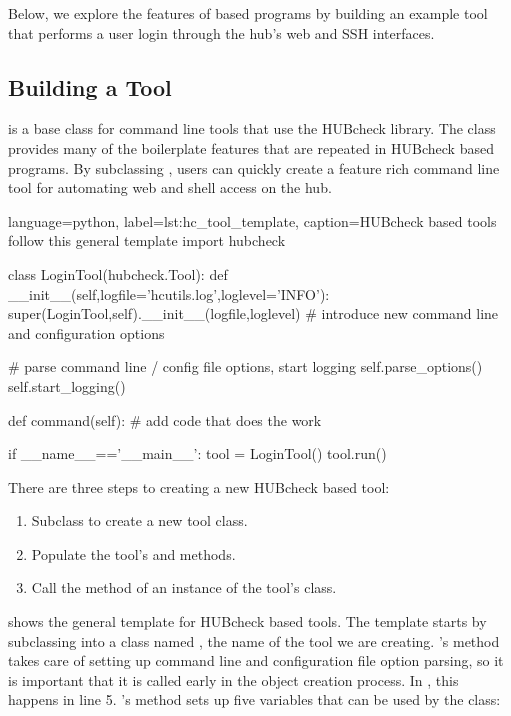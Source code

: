 Below, we explore the features of  based programs by
building an example tool that performs a user login through the hub's web
and SSH interfaces.

\subsection{Building a Tool}
\label{ssec:building_a_tool}

 is a base class for command line tools that use the
HUBcheck library. The class provides many of the boilerplate features that are
repeated in HUBcheck based programs. By subclassing ,
users can quickly create a feature rich command line tool for automating web
and shell access on the hub.

\begin{xcode}{%
  language=python,%
  label=lst:hc_tool_template,%
  caption={HUBcheck based tools follow this general template}%
}
import hubcheck

class LoginTool(hubcheck.Tool):
    def __init__(self,logfile='hcutils.log',loglevel='INFO'):
        super(LoginTool,self).__init__(logfile,loglevel)
        # introduce new command line and configuration options

        # parse command line / config file options, start logging
        self.parse_options()
        self.start_logging()

    def command(self):
        # add code that does the work

if __name__=='__main__':
    tool = LoginTool()
    tool.run()
\end{xcode}


There are three steps to creating a new HUBcheck based tool:

\begin{enumerate}
\item Subclass  to create a new tool class.
\item Populate the tool's  and  methods.
\item Call the  method of an instance of the tool's class.
\end{enumerate}

\noindent {} shows the general template for HUBcheck
based tools.  The template starts by subclassing  into a
class named , the name of the tool we are creating.
's  method takes care of
setting up command line and configuration file option parsing, so it is
important that it is called early in the object creation process. In
, this happens in line 5. 's
 method sets up five variables that can be used by the
 class:

